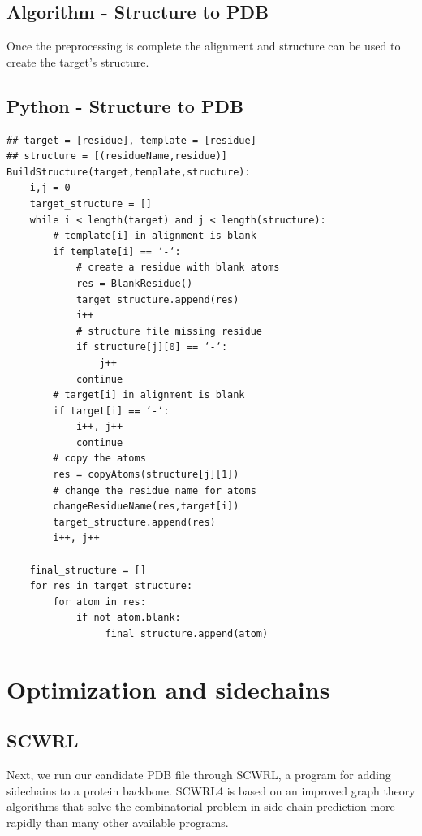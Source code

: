 \documentclass{article}
\begin{document}
\newpage
\subsection{Algorithm - Structure to PDB}

Once the preprocessing is complete the alignment and structure can be used to create the target's structure.

\subsection{Python - Structure to PDB}

\begin{lstlisting}
## target = [residue], template = [residue]
## structure = [(residueName,residue)]
BuildStructure(target,template,structure):
    i,j = 0
    target_structure = []
    while i < length(target) and j < length(structure):
        # template[i] in alignment is blank
        if template[i] == ‘-‘:
            # create a residue with blank atoms
            res = BlankResidue()
            target_structure.append(res)
            i++
            # structure file missing residue
            if structure[j][0] == ‘-‘:
                j++
            continue
        # target[i] in alignment is blank
        if target[i] == ‘-‘:
            i++, j++
            continue
        # copy the atoms
        res = copyAtoms(structure[j][1])
        # change the residue name for atoms
        changeResidueName(res,target[i])
        target_structure.append(res)
        i++, j++
    
    final_structure = []
    for res in target_structure:
        for atom in res:
            if not atom.blank:
                 final_structure.append(atom)
\end{lstlisting}


\section{Optimization and sidechains}

\subsection{SCWRL}

Next, we run our candidate PDB file through SCWRL, a program for adding sidechains to a protein backbone.  SCWRL4 is based on an improved graph theory algorithms that solve the combinatorial problem in side-chain prediction more rapidly than many other available programs.\\
\end{document}
